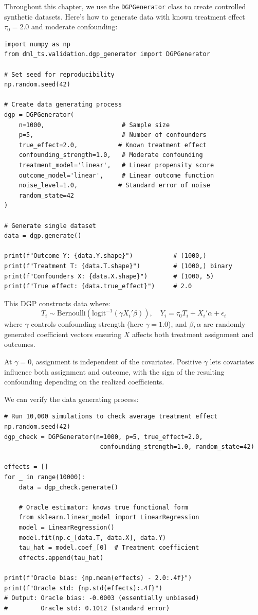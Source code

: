 Throughout this chapter, we use the \texttt{DGPGenerator} class to create controlled synthetic datasets. Here's how to generate data with known treatment effect $\tau_0 = 2.0$ and moderate confounding:

\begin{verbatim}
import numpy as np
from dml_ts.validation.dgp_generator import DGPGenerator

# Set seed for reproducibility
np.random.seed(42)

# Create data generating process
dgp = DGPGenerator(
    n=1000,                     # Sample size
    p=5,                        # Number of confounders
    true_effect=2.0,           # Known treatment effect
    confounding_strength=1.0,   # Moderate confounding
    treatment_model='linear',   # Linear propensity score
    outcome_model='linear',     # Linear outcome function
    noise_level=1.0,           # Standard error of noise
    random_state=42
)

# Generate single dataset
data = dgp.generate()

print(f"Outcome Y: {data.Y.shape}")           # (1000,)
print(f"Treatment T: {data.T.shape}")         # (1000,) binary
print(f"Confounders X: {data.X.shape}")       # (1000, 5)
print(f"True effect: {data.true_effect}")     # 2.0
\end{verbatim}

This DGP constructs data where:
\[
T_i \sim \text{Bernoulli}\left(\text{logit}^{-1}(\gamma X_i'\beta)\right), \quad
Y_i = \tau_0 T_i + X_i'\alpha + \epsilon_i
\]
where $\gamma$ controls confounding strength (here $\gamma=1.0$), and $\beta, \alpha$ are randomly generated coefficient vectors ensuring $X$ affects both treatment assignment and outcomes.

At $\gamma=0$, assignment is independent of the covariates. Positive $\gamma$ lets covariates influence both assignment and outcome, with the sign of the resulting confounding depending on the realized coefficients.

We can verify the data generating process:

\begin{verbatim}
# Run 10,000 simulations to check average treatment effect
np.random.seed(42)
dgp_check = DGPGenerator(n=1000, p=5, true_effect=2.0,
                          confounding_strength=1.0, random_state=42)

effects = []
for _ in range(10000):
    data = dgp_check.generate()

    # Oracle estimator: knows true functional form
    from sklearn.linear_model import LinearRegression
    model = LinearRegression()
    model.fit(np.c_[data.T, data.X], data.Y)
    tau_hat = model.coef_[0]  # Treatment coefficient
    effects.append(tau_hat)

print(f"Oracle bias: {np.mean(effects) - 2.0:.4f}")
print(f"Oracle std: {np.std(effects):.4f}")
# Output: Oracle bias: -0.0003 (essentially unbiased)
#         Oracle std: 0.1012 (standard error)
\end{verbatim}

